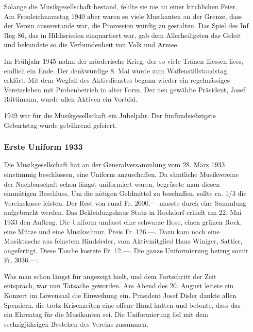 \begin{history}
    Solange die Musikgesellschaft bestand, fehlte sie nie an einer kirchlichen
    Feier. Am Fronleichnamstag 1940 aber waren so viele Musikanten an der
    Grenze, dass der Verein ausserstande war, die Prozession würdig zu
    gestalten. Das Spiel des Inf Reg 86, das in Hildisrieden einquartiert war,
    gab dem Allerheiligsten das Geleit und bekundete so die Verbundenheit von
    Volk und Armee.

    Im Frühjahr 1945 nahm der mörderische Krieg, der so viele Tränen fliessen
    liess, endlich ein Ende. Der denkwürdige 8. Mai wurde zum
    Waffenstillstandstag erklärt. Mit dem Wegfall des Aktivdienstes begann
    wieder ein regelmässiges Vereinsleben mit Probenbetrieb in alter Form. Der
    neu gewählte Präsident, Josef Rüttimann, wurde allen Aktiven ein Vorbild.

    1949 war für die Musikgesellschaft ein Jubeljahr. Der fünfundsiebzigste
    Geburtstag wurde gebührend gefeiert.

    \subsubsection*{Erste Uniform 1933}

    Die Musikgesellschaft hat an der Generalversammlung vom 28. März 1933
    einstimmig beschlossen, eine Uniform anzuschaffen. Da sämtliche Musikvereine
    der Nachbarschaft schon längst uniformiert waren, begrüsste man diesen
    einmütigen Beschluss. Um die nötigen Geldmittel zu beschaffen, sollte ca.
    1/3 die Vereinskasse leisten. Der Rest von rund Fr. 2000.— musste durch eine
    Sammlung aufgebracht werden. Das Bekleidungshaus Stutz in Hochdorf erhielt
    am 22. Mai 1933 den Auftrag. Die Uniform umfasst eine schwarze Hose, einen
    grünen Rock, eine Mütze und eine Musikschnur. Preis Fr. 126.—. Dazu kam noch
    eine Musiktasche aus feinstem Rindsleder, vom Aktivmitglied Hans Winiger,
    Sattler, angefertigt. Diese Tasche kostete Fr. 12.—. Die ganze Uniformierung
    betrug somit Fr. 3036.—.

    Was man schon längst für angezeigt hielt, und dem Fortschritt der Zeit
    entsprach, war nun Tatsache geworden. Am Abend des 20. August leitete ein
    Konzert im Löwensaal die Einweihung ein. Präsident Josef Disler dankte allen
    Spendern, die trotz Krisenzeiten eine offene Hand hatten und betonte, dass
    das ein Ehrentag für die Musikanten sei. Die Uniformierung fiel mit dem
    sechzigjährigen Bestehen des Vereins zusammen.

\end{history}

